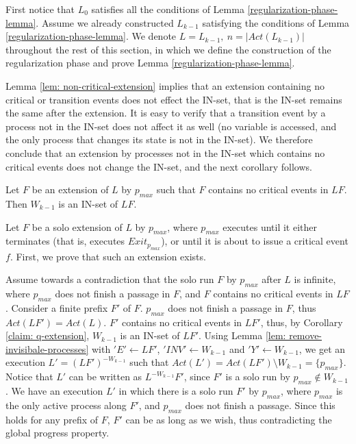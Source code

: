 First notice that $L_0$ satisfies all the conditions of Lemma \ref{regularization-phase-lemma}. Assume we already constructed $L_{k-1}$ satisfying the conditions of Lemma \ref{regularization-phase-lemma}. We denote $L=L_{k-1},\ n=|Act(L_{k-1})|$ throughout the rest of this section, in which we define the construction of the regularization phase and prove Lemma \ref{regularization-phase-lemma}.

Lemma \ref{lem: non-critical-extension} implies that an extension containing no critical or transition events does not effect the IN-set, that is the IN-set remains the same after the extension. It is easy to verify that a transition event by a process not in the IN-set does not affect it as well (no variable is accessed, and the only process that changes its state is not in the IN-set). We therefore conclude that an extension by processes not in the IN-set which contains no critical events does not change the IN-set, and the next corollary follows.
\begin{corollary} \label{claim: q-extension}
	Let $F$ be an extension of $L$ by $p_{max}$ such that $F$ contains no critical events in $L F$. Then $W_{k-1}$ is an IN-set of $L F$.
\end{corollary}

Let $F$ be a solo extension of $L$ by $p_{max}$, where $p_{max}$ executes until it either terminates (that is, executes $Exit_{p_{max}}$), or until it is about to issue a critical event $f$. First, we prove that such an extension exists.

Assume towards a contradiction that the solo run $F$ by $p_{max}$ after $L$ is infinite, where $p_{max}$ does not finish a passage in $F$, and $F$ contains no critical events in $L F$. Consider a finite prefix $F'$ of $F$. $p_{max}$ does not finish a passage in $F$, thus $Act(L F') = Act(L)$. $F'$ contains no critical events in $L F'$, thus, by Corollary \ref{claim: q-extension}, $W_{k-1}$ is an IN-set of $L F'$. Using Lemma \ref{lem: remove-invisibale-processes} with $'E' \leftarrow L F'$, $'INV' \leftarrow W_{k-1}$ and $'Y' \leftarrow W_{k-1}$, we get an execution $L' = (L F')^{-W_{k-1}}$ such that $Act(L') = Act(L F') \setminus W_{k-1} = \{p_{max}\}$. Notice that $L'$ can be written as $L^{-W_{k-1}} F'$, since $F'$ is a solo run by $p_{max} \notin W_{k-1}$. We have an execution $L'$ in which there is a solo run $F'$ by $p_{max}$, where $p_{max}$ is the only active process along $F'$, and $p_{max}$ does not finish a passage. Since this holds for any prefix of $F$, $F'$ can be as long as we wish, thus contradicting the global progress property.

